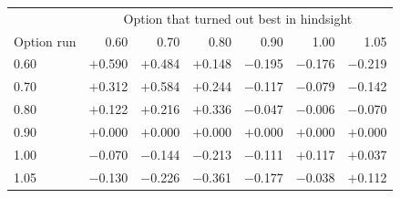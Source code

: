 \begin{tabular}{lrrrrrr}
\toprule
 & \multicolumn{6}{c}{Option that turned out best in hindsight} \\
Option run & 0.60 & 0.70 & 0.80 & 0.90 & 1.00 & 1.05 \\
\midrule
0.60 & $+$0.590 & $+$0.484 & $+$0.148 & $-$0.195 & $-$0.176 & $-$0.219 \\
0.70 & $+$0.312 & $+$0.584 & $+$0.244 & $-$0.117 & $-$0.079 & $-$0.142 \\
0.80 & $+$0.122 & $+$0.216 & $+$0.336 & $-$0.047 & $-$0.006 & $-$0.070 \\
0.90 & $+$0.000 & $+$0.000 & $+$0.000 & $+$0.000 & $+$0.000 & $+$0.000 \\
1.00 & $-$0.070 & $-$0.144 & $-$0.213 & $-$0.111 & $+$0.117 & $+$0.037 \\
1.05 & $-$0.130 & $-$0.226 & $-$0.361 & $-$0.177 & $-$0.038 & $+$0.112 \\
\bottomrule
\end{tabular}
